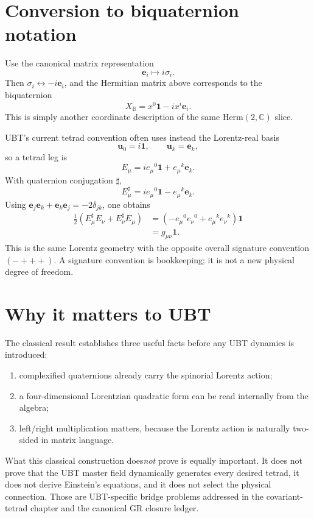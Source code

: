 \section{Conversion to biquaternion notation}
Use the canonical matrix representation
\[
 \mathbf e_i\longmapsto i\sigma_i.
\]
Then $\sigma_i\leftrightarrow -i\mathbf e_i$, and the Hermitian matrix above
corresponds to the biquaternion
\[
 X_{\mathbb B}=x^0\mathbf1-i x^i\mathbf e_i.
\]
This is simply another coordinate description of the same
$\mathrm{Herm}(2,\mathbb C)$ slice.

UBT's current tetrad convention often uses instead the Lorentz-real basis
\[
 \mathbf u_0=i\mathbf1,
 \qquad \mathbf u_k=\mathbf e_k,
\]
so a tetrad leg is
\[
 E_\mu=i e_\mu{}^0\mathbf1+e_\mu{}^k\mathbf e_k.
\]
With quaternion conjugation $\sharp$,
\[
 E_\mu^\sharp=i e_\mu{}^0\mathbf1-e_\mu{}^k\mathbf e_k.
\]
Using $\mathbf e_j\mathbf e_k+\mathbf e_k\mathbf e_j=-2\delta_{jk}$,
one obtains
\begin{align*}
 \frac12(E_\mu^\sharp E_\nu+E_\nu^\sharp E_\mu)
 &=\left(-e_\mu{}^0e_\nu{}^0+e_\mu{}^k e_\nu{}^k\right)\mathbf1\\
 &=g_{\mu\nu}\mathbf1.
\end{align*}
This is the same Lorentz geometry with the opposite overall signature
convention $(-+++)$.  A signature convention is bookkeeping; it is not a new
physical degree of freedom.

\section{Why it matters to UBT}
The classical result establishes three useful facts before any UBT dynamics is
introduced:
\begin{enumerate}
 \item complexified quaternions already carry the spinorial Lorentz action;
 \item a four-dimensional Lorentzian quadratic form can be read internally from
       the algebra;
 \item left/right multiplication matters, because the Lorentz action is
       naturally two-sided in matrix language.
\end{enumerate}

What this classical construction does\emph{not} prove is equally important.
It does not prove that the UBT master field dynamically generates every desired
tetrad, it does not derive Einstein's equations, and it does not select the
physical connection.  Those are UBT-specific bridge problems addressed in the
covariant-tetrad chapter and the canonical GR closure ledger.

